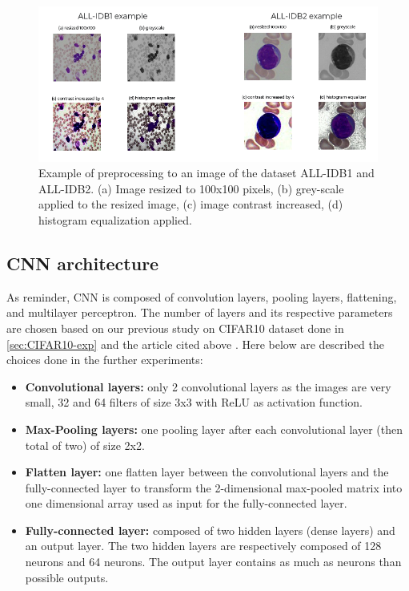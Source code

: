 \documentclass[11pt, openany]{report}
\theoremstyle{plain}
\theoremstyle{definition}
\theoremstyle{remark}
\begin{document}
\begin{figure}[H]
  \centering
  \includegraphics[scale=0.5]{figures/preproc-leuk.PNG}
  \caption{Example of preprocessing to an image of the dataset ALL-IDB1 and ALL-IDB2. (a) Image resized to 100x100 pixels, (b) grey-scale applied to the resized image, (c) image contrast increased, (d) histogram equalization applied.}
  \label{fig:preproc-leuk}
\end{figure}

\newpage
\subsection{CNN architecture}
As reminder, CNN is composed of convolution layers, pooling layers, flattening, and
multilayer perceptron. The number of layers and its respective parameters are chosen based on our previous study on CIFAR10 dataset done in \autoref{sec:CIFAR10-exp} and the article cited above \cite{leukemia}. Here below are described the choices done in the further experiments: 

\begin{itemize}
\item \textbf{Convolutional layers:} only 2 convolutional layers as the images are very small, 32 and 64 filters of size 3x3 with ReLU as activation function.  

\item \textbf{Max-Pooling layers:} one pooling layer after each convolutional layer (then total of two) of size 2x2. 

\item \textbf{Flatten layer:} one flatten layer between the convolutional layers and the fully-connected layer to transform the 2-dimensional max-pooled matrix into one dimensional array used as input for the fully-connected layer. 

\item \textbf{Fully-connected layer:} composed of two hidden layers (dense layers) and an output layer. The two hidden layers are respectively composed of 128 neurons and 64 neurons. The output layer contains as much as neurons than possible outputs.  
\end{itemize}
\end{document}

